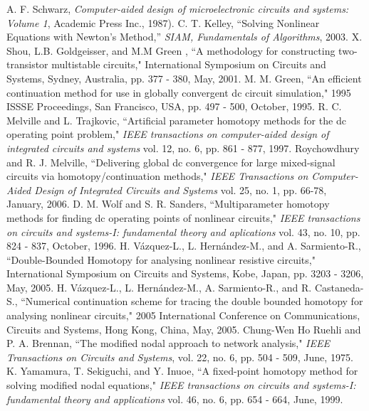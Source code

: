 \documentclass{elex}
\begin{document}
\begin{thebibliography}{99}
 A. F. Schwarz, {\it Computer-aided design of microelectronic circuits and systems: Volume 1}, Academic Press Inc., 1987).
 C. T. Kelley, ``Solving Nonlinear Equations with Newton's Method,'' {\it SIAM, Fundamentals of Algorithms}, 2003.
 X. Shou,  L.B. Goldgeisser, and  M.M Green , ``A methodology for constructing two-transistor multistable circuits," International Symposium on Circuits and Systems, Sydney, Australia, pp. 377 - 380, May, 2001.
 M. M. Green, ``An efficient continuation method for use in globally convergent dc circuit simulation," 1995 ISSSE Proceedings, San Francisco, USA, pp. 497 - 500, October, 1995.
 R. C. Melville and L. Trajkovic, ``Artificial parameter homotopy methods for the dc operating point problem," {\it IEEE transactions on computer-aided design of integrated circuits and systems} vol. 12, no. 6, pp. 861 - 877, 1997.
 Roychowdhury and R. J. Melville, ``Delivering global dc convergence for large mixed-signal circuits via homotopy/continuation methods," {\it IEEE Transactions on Computer-Aided Design of Integrated Circuits and Systems} vol. 25, no. 1, pp. 66-78, January, 2006.
 D. M. Wolf and S. R. Sanders, ``Multiparameter homotopy methods for finding dc operating points of nonlinear circuits," {\it IEEE transactions on circuits and systems-I: fundamental theory and aplications} vol. 43, no. 10, pp. 824 - 837, October, 1996.
 H. V\'azquez-L., L. Hern\'andez-M., and A. Sarmiento-R., ``Double-Bounded Homotopy for analysing nonlinear resistive circuits," International Symposium on Circuits and Systems, Kobe, Japan, pp. 3203 - 3206, May, 2005.
 H. V\'azquez-L., L. Hern\'andez-M., A. Sarmiento-R., and R. Castaneda-S., ``Numerical continuation scheme for tracing the double bounded homotopy for analysing nonlinear circuits," 2005 International Conference on Communications, Circuits and Systems, Hong Kong, China, May, 2005.  
 Chung-Wen Ho Ruehli and P. A. Brennan, ``The modified nodal approach to network analysis," {\it IEEE Transactions on Circuits and Systems}, vol. 22, no. 6, pp. 504 - 509, June, 1975.
 K. Yamamura, T. Sekiguchi, and Y. Inuoe, ``A fixed-point homotopy method for solving modified nodal equations," {\it IEEE transactions on circuits and systems-I: fundamental theory and applications} vol. 46, no. 6, pp. 654 - 664, June, 1999.
\end{thebibliography}
\end{document}
